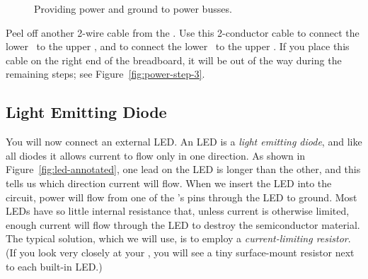 \begin{figure}
    \centering
    \hfil
    \hfil
    \caption{Providing power and ground to power busses.}
\end{figure}

Peel off another 2-wire cable from the \rainbow. Use this 2-conductor cable to
connect the lower \power\ to the upper \power, and to connect the lower
\ground\ to the upper \ground. If you place this cable on the right end of the
breadboard, it will be out of the way during the remaining steps; see
Figure~\ref{fig:power-step-3}.


\subsection{Light Emitting Diode}

You will now connect an external LED. An LED is a \textit{light emitting diode},
and like all diodes it allows current to flow only in one direction. As shown
in Figure~\ref{fig:led-annotated}, one lead on the LED is longer than the
other, and this tells us which direction current will flow. When we insert the
LED into the circuit, power will flow from one of the \nano's pins through the
LED to ground. Most LEDs have so little internal resistance that, unless
current is otherwise limited, enough current will flow through the LED to
destroy the semiconductor material. The typical solution, which we will use, is
to employ a \textit{current-limiting resistor}. (If you look very closely at
your \nano, you will see a tiny surface-mount resistor next to each built-in
LED.)

